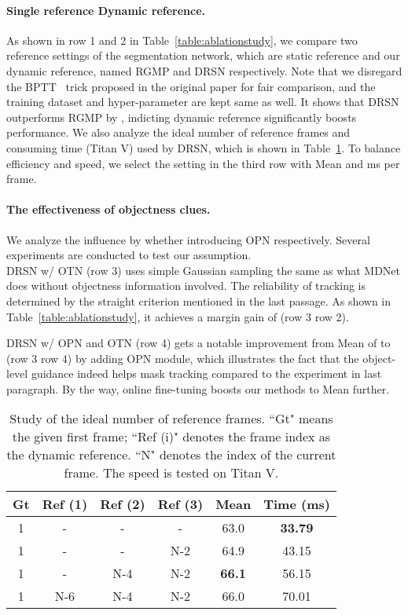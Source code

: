 \documentclass[10pt,twocolumn,letterpaper]{article}
\begin{document}
\paragraph{Single reference \vs Dynamic reference.} As shown in row 1 and 2 in Table~\ref{table:ablationstudy}, we compare two reference settings of the segmentation network, which are static reference and our dynamic reference, named RGMP and DRSN respectively. Note that we disregard the BPTT~\cite{rgmp_cvpr18} trick proposed in the original paper for fair comparison, and the training dataset and hyper-parameter are kept same as well. It shows that DRSN outperforms RGMP by , indicting dynamic reference significantly boosts performance. We also analyze the ideal number of reference frames and consuming time (Titan V) used by DRSN, which is shown in Table~\ref{table:drsn_ref_as}. To balance efficiency and speed, we select the setting in the third row with   Mean and  ms per frame.

\paragraph{The effectiveness of objectness clues.} We analyze the influence by whether introducing OPN respectively. Several experiments are conducted to test our assumption.
\\

DRSN w/ OTN (row 3) uses simple Gaussian sampling the same as what MDNet does without objectness information involved. The reliability of tracking is determined by the straight criterion mentioned in the last passage. As shown in Table~\ref{table:ablationstudy}, it achieves a margin gain of  (row 3 \vs row 2).

DRSN w/ OPN and OTN (row 4) gets a notable  improvement from  Mean of  to  (row 3 \vs row 4) by adding OPN module, which illustrates the fact that the object-level guidance indeed helps mask tracking compared to the experiment in last paragraph. By the way, online fine-tuning boosts our methods to   Mean further.

    \begin{table}[!t]
\caption{Study of the ideal number of reference frames. ``Gt" means the given first frame; ``Ref (i)" denotes the frame index as the dynamic reference. ``N" denotes the index of the current frame. The speed is tested on Titan V.}
    \vspace{3mm}
      \centering
      \small
\setlength{\tabcolsep}{2mm}
      {\begin{tabular}{c c c c | c c}
        \toprule
        Gt & Ref (1) & Ref (2) & Ref (3) &  Mean & Time (ms) \\
        \midrule
        1 &  -  &  -  & -   & 63.0 & \textbf{33.79} \\
        1 &  -  &  -  & N-2 & 64.9 & 43.15 \\
        1 &  -  & N-4 & N-2 & \textbf{66.1} & 56.15 \\
        1 & N-6 & N-4 & N-2 & 66.0 & 70.01 \\
        \bottomrule
      \end{tabular}}
      \label{table:drsn_ref_as}
    \end{table}
\end{document}
